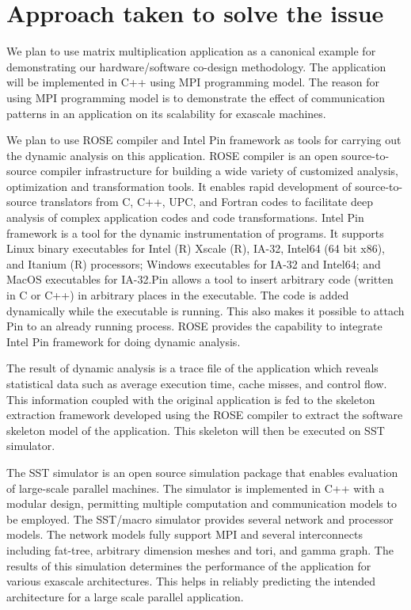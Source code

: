 \documentclass[10pt, twocolumn]{article}
\begin{document}
\section{Approach taken to solve the issue}
We plan to use matrix multiplication application as a canonical example for demonstrating our hardware/software co-design methodology. The application will be implemented in C++ using MPI programming model.  The reason for using MPI programming model is to demonstrate the effect of communication patterns in an application on its scalability for exascale machines. 

We plan to use ROSE compiler and Intel Pin framework as tools for carrying out the dynamic analysis on this application.  ROSE compiler is an open source-to-source compiler infrastructure for building a wide variety of customized analysis, optimization and transformation tools. It enables rapid development of source-to-source translators from C, C++, UPC, and Fortran codes to facilitate deep analysis of complex application codes and code transformations. Intel Pin framework is a tool for the dynamic instrumentation of programs. It supports Linux binary executables for Intel (R) Xscale (R), IA-32, Intel64 (64 bit x86), and Itanium (R) processors; Windows executables for IA-32 and Intel64; and MacOS executables for IA-32.Pin allows a tool to insert arbitrary code (written in C or C++) in arbitrary places in the executable. The code is added dynamically while the executable is running. This also makes it possible to attach Pin to an already running process.  ROSE provides the capability to integrate Intel Pin framework for doing dynamic analysis.

The result of dynamic analysis is  a trace file of the application which reveals statistical data such as average execution time, cache misses, and control flow.  This information coupled with the original application is fed to the skeleton extraction framework developed using the ROSE compiler to extract the software skeleton model of the application.  This skeleton will then be executed on SST simulator. 

The SST simulator is an open source simulation package that enables evaluation of large-scale parallel machines. The simulator is implemented in C++ with a modular design, permitting multiple computation and communication models to be employed. The SST/macro simulator provides several network and processor models. The network models fully support MPI and several interconnects including fat-tree, arbitrary dimension meshes and tori, and gamma graph.  The results of this simulation determines the performance of the application for various exascale architectures.  This helps in reliably predicting the intended architecture for a large scale parallel application.
\end{document}
